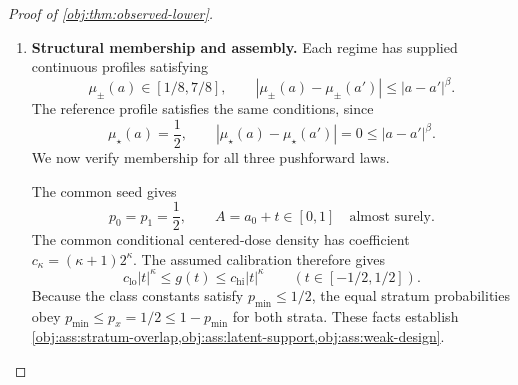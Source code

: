 \begin{proof}[Proof of \cref{obj:thm:observed-lower}]
\begin{enumerate}
For the tail calculation, define
\[
\lambda:=\frac{\ell_{\mathrm M}^2}{\sigma^2}
=\frac{\ell_{\mathrm M}^2L_n}{\tau_{\mathrm M}},
\qquad
D_{\mathrm M}:=
\frac{\gamma C_{\mathrm M}}
{\exp(1)\ell_{\mathrm M}^2}\ge2\exp(1).
\]
The cancellation order and the bound \(B_{\mathrm M}\le2\sqrt{\tau_{\mathrm M}}\) imply
\[
\frac{J}{\exp(1)\lambda}
\ge
D_{\mathrm M}\frac{\tau_{\mathrm M}}{B_{\mathrm M}}
\ge\exp(1)\sqrt{\tau_{\mathrm M}}
\ge2.
\]
In particular \(J\ge2\lambda\). Taking logarithms, and using
\(\log(\exp(1)+1)\le2\), gives
\[
\log\frac{J}{\exp(1)\lambda}
\ge1+\frac12\log\tau_{\mathrm M}
\ge\frac{B_{\mathrm M}}2.
\]
Hence
\[
J\log\frac{J}{\exp(1)\lambda}
\ge
\frac{\gamma C_{\mathrm M}L_n}{B_{\mathrm M}}
\frac{B_{\mathrm M}}2
=
\frac{\gamma C_{\mathrm M}L_n}{2}
\ge4L_n.
\]
The factorial-tail estimate now gives
\[
\mathcal T_{\sigma,\ell_{\mathrm M},J}
\le
2\exp\left(-J\log\frac{J}{\exp(1)\lambda}\right)
\le2\exp(-4L_n).
\]
Using \(h\le\sigma\) for the first inequality and \(0<h\le1\) for the second, the Gaussian prefactor satisfies
\[
\sigma^{-\kappa-1}h^{2\beta+2\kappa+2}\le h^d\le1.
\]
Also \(L_n\ge0\), so
\[
n\exp(-4L_n)
\le n\exp(-L_n)
=\exp(-1)\le1.
\]
It follows that
\[
n\sigma^{-\kappa-1}h^{2\beta+2\kappa+2}
\mathcal T_{\sigma,\ell_{\mathrm M},J}\le2,
\]
and therefore
\[
n\chi^2(Q_\pm,Q_\star)
\le2B_{\mathrm I}\varepsilon^2
\le\log(1+\tau^2).
\]
The same product comparison proves
\[
\operatorname{TV}(Q_{P_+}^n,Q_{P_-}^n)\le\tau.
\]

\item \textbf{Structural membership and assembly.}
Each regime has supplied continuous profiles satisfying
\[
\mu_\pm(a)\in[1/8,7/8],\qquad
|\mu_\pm(a)-\mu_\pm(a')|\le|a-a'|^\beta.
\]
The reference profile satisfies the same conditions, since
\[
\mu_\star(a)=\frac12,\qquad
|\mu_\star(a)-\mu_\star(a')|=0\le|a-a'|^\beta.
\]
We now verify membership for all three pushforward laws.

The common seed gives
\[
p_0=p_1=\frac12,\qquad
A=a_0+t\in[0,1]\quad\text{almost surely}.
\]
The common conditional centered-dose density has coefficient
\(c_\kappa=(\kappa+1)2^\kappa\). The assumed calibration therefore gives
\[
c_{\mathrm{lo}}|t|^\kappa\le g(t)
\le c_{\mathrm{hi}}|t|^\kappa
\qquad(t\in[-1/2,1/2]).
\]
Because the class constants satisfy \(p_{\min}\le1/2\), the equal stratum probabilities obey \(p_{\min}\le p_x=1/2\le1-p_{\min}\) for both strata. These facts establish \cref{obj:ass:stratum-overlap,obj:ass:latent-support,obj:ass:weak-design}.


\end{enumerate}
\end{proof}

